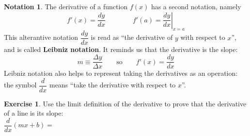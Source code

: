 \documentclass[11pt,reqno,final]{amsart}
\numberwithin{figure}{section}
\theoremstyle{definition} %
\newtheorem{notation}[equation]{Notation}%
\newtheorem{exercise}[question]{Exercise}
\begin{document}
\begin{notation}
        The derivative of a function $f(x)$ has a second notation, namely
        \[
                f'(x) = \dfrac{dy}{dx}
                \qquad \qquad
                f'(a) = \left.\dfrac{dy}{dx}\right|_{x = a}
        \]
        This alterantive notation $\dfrac{dy}{dx}$ is read as ``the derivative of $y$ with respect to $x$'',
        and is called \textbf{Leibniz notation}.
        It reminds us that the derivative is the slope:
        \[
                m \equiv \dfrac{\Delta y}{\Delta x}
                \qquad
                \mbox{so}
                \qquad
                f'(x) = \dfrac{dy}{dx}
        \]
        Leibniz notation also helps to represent taking the derivatives as an operation:
        the symbol $\dfrac{d}{dx}$ means ``take the derivative with respect to $x$''.
\end{notation}


\begin{exercise}
        Use the limit definition of the derivative to prove that the derivative of a line is its slope:\\
        $\dfrac{d}{dx} \left(mx+b\right) = $
        \vfill                
\end{exercise}
\end{document}
